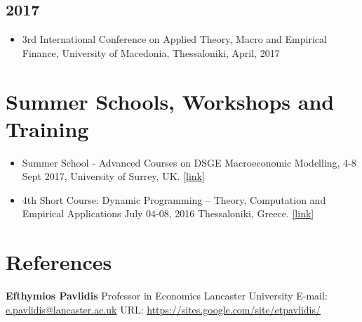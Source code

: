 \documentclass[10pt,]{article}
\providecommand{\tightlist}{%
        \setlength{\itemsep}{0pt}\setlength{\parskip}{0pt}}
\begin{document}
              \hypertarget{section-2}{%
              \subsection{2017}\label{section-2}}
              
              \begin{itemize}
              \tightlist
              \item
                3rd International Conference on Applied Theory, Macro and Empirical
                Finance, University of Macedonia, Thessaloniki, April, 2017
              \end{itemize}
              
              \hypertarget{summer-schools-workshops-and-training}{%
              \section{Summer Schools, Workshops and
              Training}\label{summer-schools-workshops-and-training}}
              
              \begin{itemize}
              \item
                Summer School - Advanced Courses on DSGE Macroeconomic Modelling, 4-8
                Sept 2017, University of Surrey, UK.
                \href{https://www.surrey.ac.uk/events/20180903-foundations-and-advanced-courses-dsge-macroeconomic-modelling-and-conference-summer}{{[}link{]}}
              \item
                4th Short Course: Dynamic Programming -- Theory, Computation and
                Empirical Applications July 04-08, 2016 Thessaloniki, Greece.
                \href{http://sce2016.uom.gr/}{{[}link{]}}
              \end{itemize}
              
              \hypertarget{references}{%
              \section{References}\label{references}}
              
              \textbf{Efthymios Pavlidis} \newline  Professor in Economics \newline 
              Lancaster University \newline  E-mail: \url{e.pavlidis@lancaster.ac.uk}
              \newline  URL: \url{https://sites.google.com/site/etpavlidis/}
              
\end{document}
